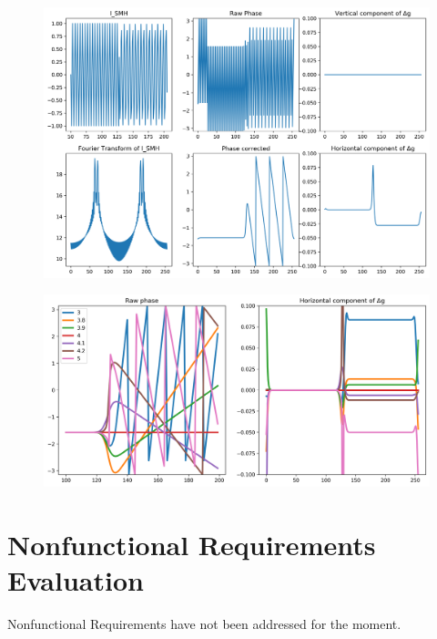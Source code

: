 \documentclass[12pt, titlepage]{article}
\begin{document}
\begin{figure}[H]
\begin{center}
\includegraphics[scale=0.5]{Figures/Test_3_explanation_1D.png}
\caption{}
\label{fig:Test_3_explaination_1D}
\end{center}
\end{figure}

\begin{figure}[H]
\begin{center}
\includegraphics[scale=0.5]{Figures/Test_3_test_results.png}
\caption{}
\label{fig:Test_3_test_results}
\end{center}
\end{figure}

\section{Nonfunctional Requirements Evaluation}

Nonfunctional Requirements have not been addressed for the moment.
	
\end{document}
